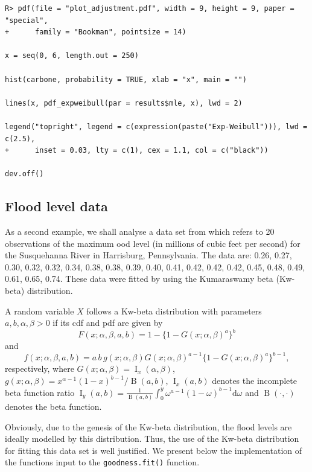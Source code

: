 \documentclass[10pt,letterpaper]{article}
\begin{document}
\begin{verbatim}
R> pdf(file = "plot_adjustment.pdf", width = 9, height = 9, paper = "special",
+      family = "Bookman", pointsize = 14)

x = seq(0, 6, length.out = 250)

hist(carbone, probability = TRUE, xlab = "x", main = "")

lines(x, pdf_expweibull(par = results$mle, x), lwd = 2)

legend("topright", legend = c(expression(paste("Exp-Weibull"))), lwd = c(2.5),
+      inset = 0.03, lty = c(1), cex = 1.1, col = c("black"))

dev.off()
\end{verbatim}


\subsection{Flood level data}

As a second example, we shall analyse a data set from \cite{Dumonceaux73} which refers to 20 observations of
the maximum ood level (in millions of cubic feet per second) for the Susquehanna River in Harrisburg, Pennsylvania.
The data are: 0.26, 0.27, 0.30, 0.32, 0.32, 0.34, 0.38, 0.38, 0.39, 0.40, 0.41, 0.42, 0.42, 0.42, 0.45,
0.48, 0.49, 0.61, 0.65, 0.74.
These data were fitted by using the Kumaraswamy beta (Kw-beta) distribution.

A random variable $X$ follows a Kw-beta distribution with parameters $a, b, \alpha, \beta > 0$ if its cdf and pdf are given by
$$
F(x; \alpha, \beta, a, b) = 1-\{1-G(x; \alpha, \beta)^{a}\}^{b}$$
and
$$
f(x; \alpha, \beta, a, b) = a\,b\,g(x;\alpha, \beta)G(x;\alpha, \beta)^{a-1}\{1-G(x;\alpha, \beta)^{a}\}^{b-1},
$$
respectively, where $G(x; \alpha,\beta)=\operatorname{I}_{x}(\alpha,\beta)$, $g(x;\alpha,\beta) = x^{\alpha-1}(1-x)^{b-1}/\operatorname{B}(a,b)$,
$\operatorname{I}_{x}(a,b)$ denotes the incomplete beta function ratio
$\operatorname{I}_{y}(a,b) = \frac{1}{\operatorname{B}(a,b)}
\int^{y}_{0} \omega^{a-1}(1-\omega)^{b-1}\mathrm{d}\omega$
and $\operatorname{B}(\cdot,\cdot)$ denotes the beta function.

Obviously, due to the genesis of the Kw-beta distribution, the flood levels are ideally modelled by
this distribution.
Thus, the use of the Kw-beta distribution for fitting this data set is well justified.
We present below the implementation of the functions input to the \texttt{goodness.fit()} function.
\end{document}
